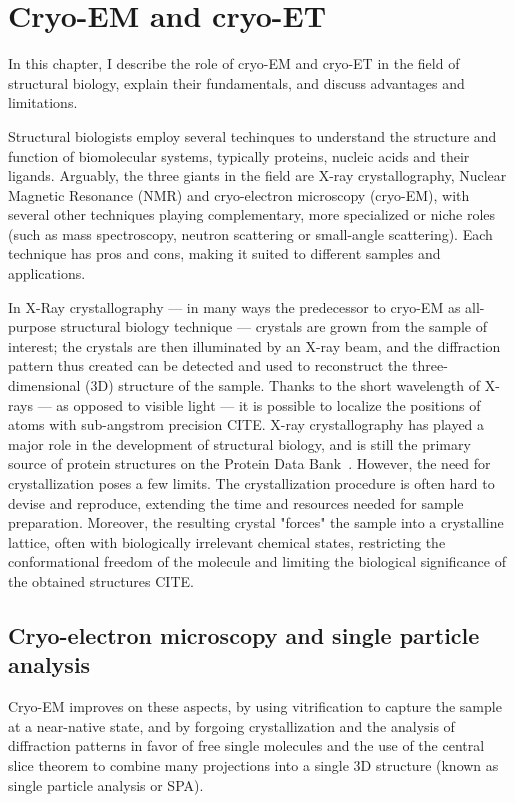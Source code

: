 \chapter{Cryo-EM and cryo-ET}

In this chapter, I describe the role of cryo-EM and cryo-ET in the field of structural biology, explain their fundamentals, and discuss advantages and limitations.

Structural biologists employ several techinques to understand the structure and function of biomolecular systems, typically proteins, nucleic acids and their ligands.
Arguably, the three giants in the field are X-ray crystallography, Nuclear Magnetic Resonance (NMR) and cryo-electron microscopy (cryo-EM), with several other techniques playing complementary, more specialized or niche roles (such as mass spectroscopy, neutron scattering or small-angle scattering).
Each technique has pros and cons, making it suited to different samples and applications.

In X-Ray crystallography --- in many ways the predecessor to cryo-EM as all-purpose structural biology technique --- crystals are grown from the sample of interest; the crystals are then illuminated by an X-ray beam, and the diffraction pattern thus created can be detected and used to reconstruct the three-dimensional (3D) structure of the sample.
Thanks to the short wavelength of X-rays --- as opposed to visible light --- it is possible to localize the positions of atoms with sub-angstrom precision CITE.
X-ray crystallography has played a major role in the development of structural biology, and is still the primary source of protein structures on the Protein Data Bank~\cite{bermanProteinDataBank2000,bermanAnnouncingWorldwideProtein2003}.
However, the need for crystallization poses a few limits.
The crystallization procedure is often hard to devise and reproduce, extending the time and resources needed for sample preparation.
Moreover, the resulting crystal "forces" the sample into a crystalline lattice, often with biologically irrelevant chemical states, restricting the conformational freedom of the molecule and limiting the biological significance of the obtained structures CITE.

\section[Cryo-EM and SPA]{Cryo-electron microscopy and single particle analysis}

Cryo-EM improves on these aspects, by using vitrification to capture the sample at a near-native state, and by forgoing crystallization and the analysis of diffraction patterns in favor of free single molecules and the use of the central slice theorem to combine many projections into a single 3D structure (known as single particle analysis or SPA).

